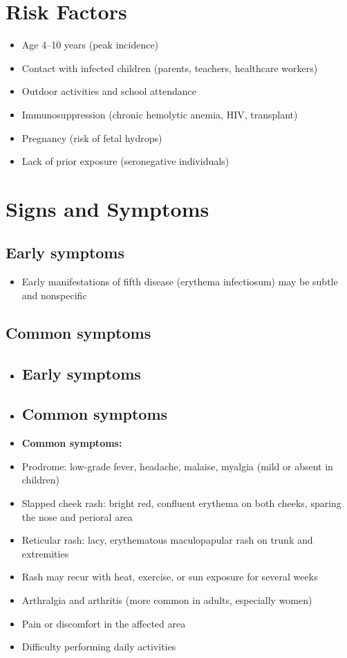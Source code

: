 \section{Risk Factors}

\begin{itemize}[noitemsep]
  \item Age 4--10 years (peak incidence)
  \item Contact with infected children (parents, teachers, healthcare workers)
  \item Outdoor activities and school attendance
  \item Immunosuppression (chronic hemolytic anemia, HIV, transplant)
  \item Pregnancy (risk of fetal hydrops)
  \item Lack of prior exposure (seronegative individuals)
\end{itemize}

\section{Signs and Symptoms}

\subsection{Early symptoms}
\begin{itemize}[noitemsep]
  \item Early manifestations of fifth disease (erythema infectiosum) may be subtle and nonspecific
\end{itemize}

\subsection{Common symptoms}
\begin{itemize}[noitemsep]
  \item \subsection{Early symptoms}
  \item \subsection{Common symptoms}
  \item \textbf{Common symptoms:}
  \item Prodrome: low-grade fever, headache, malaise, myalgia (mild or absent in children)
  \item Slapped cheek rash: bright red, confluent erythema on both cheeks, sparing the nose and perioral area
  \item Reticular rash: lacy, erythematous maculopapular rash on trunk and extremities
  \item Rash may recur with heat, exercise, or sun exposure for several weeks
  \item Arthralgia and arthritis (more common in adults, especially women)
  \item Pain or discomfort in the affected area
  \item Difficulty performing daily activities
\end{itemize}

